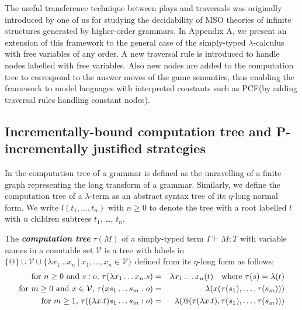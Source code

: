 \documentclass{llncs}
\newcommand\defname[1]{{\bf\em #1}\index{#1}}
\newcommand\union{\cup}
\newcommand\pcf{\textsf{PCF}}
\begin{document}
The useful transference technique between plays and traversals was
originally introduced by one of us \cite{OngLics2006} for studying the
decidability of MSO theories of infinite structures generated by
higher-order grammars. 
In Appendix A, we present an extension of this framework to the
general case of the simply-typed $\lambda$-calculus with free
variables of any order. A new traversal rule is introduced to handle
nodes labelled with free variables. Also new nodes are added to the
computation tree to correspond to the answer moves of the game
semantics, thus enabling the framework to model languages with
interpreted constants such as \pcf (by adding traversal rules handling
constant nodes).

\subsection*{Incrementally-bound computation tree and P-incrementally
  justified strategies}

In \cite{OngLics2006} the computation tree of a grammar is defined as
the unravelling of a finite graph representing the long transform of a
grammar. Similarly, we define the computation tree of a $\lambda$-term
as an abstract syntax tree of its $\eta$-long normal form.  We write
$l(t_1, \ldots, t_n)$ with $n \geq 0$ to denote the tree with a root
labelled $l$ with $n$ children subtrees $t_1$, \ldots, $t_n$.

\begin{definition}\rm
  The \defname{computation tree} $\tau(M)$ of a simply-typed term
  $\Gamma \vdash M:T$ with variable names in a countable set
  $\mathcal{V}$ is a tree with labels in $ \{ @ \} \union \mathcal{V}
  \union \{ \lambda x_1 \ldots x_n \ | \ x_1 ,\ldots, x_n \in
  \mathcal{V} \}$ defined from its $\eta$-long form as follows:
\begin{eqnarray*}
  \mbox{for $n\geq 0$ and $s:o$, } \tau(\lambda x_1 \ldots x_n . s) &=& \lambda x_1 \ldots x_n(t) \mbox{\quad where $\tau(s) = \lambda(t)$}\\
  \mbox{for $m\geq 0$ and $x \in  \mathcal{V}$, } \tau( x s_1 \ldots s_m : o) &=&  \lambda (x(\tau(s_1),\ldots,\tau(s_m)))\\
  \mbox{for $m \geq 1$, } \tau((\lambda x.t) s_1 \ldots s_m :o) &=& \lambda (@(\tau(\lambda x.t),\tau(s_1),\ldots,\tau(s_m)))
\end{eqnarray*}
\end{definition}
\end{document}
